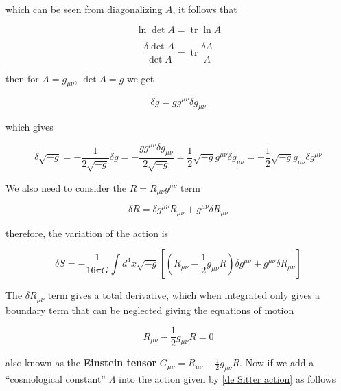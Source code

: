 \documentclass[a4paper,11pt]{article}
\numberwithin{equation}{section}
\numberwithin{figure}{section}
\begin{document}
\begin{large}
which can be seen from diagonalizing $A$, it follows that

\begin{equation}
\label{ln det A}    
    \ln \det A= \operatorname{tr} \ln A
\end{equation}

\begin{equation}
 \label{delta det A}   
    \frac{\delta \det A}{\det A} = \operatorname{tr} \frac{\delta A}{A}
\end{equation}


then for $A=g_{\mu \nu}$, $\det A=g$ we get


\begin{equation}
\label{delta g}    
    \delta g=g g^{\mu \nu} \delta g_{\mu \nu}
\end{equation}


which gives

\begin{equation}
\label{delta rt -g}    
    \delta \sqrt{-g}= -\frac{1}{2\sqrt{-g}}\delta g= -\frac{gg^{\mu \nu} \delta g_{\mu \nu}}{2\sqrt{-g}}=\frac{1}{2}\sqrt{-g} g^{\mu \nu} \delta g_{\mu \nu}=-\frac{1}{2}\sqrt{-g} g_{\mu \nu} \delta g^{\mu \nu}
\end{equation}


We also need to consider the $R=R_{\mu \nu} g^{\mu \nu}$ term

\begin{equation}
\label{delta R}
    \delta R= \delta g^{\mu \nu} R_{\mu \nu}+g^{\mu \nu} \delta R_{\mu \nu}
\end{equation}

therefore, the variation of the action is

\begin{equation}
\label{variation of action}
    \delta S= - \frac{1}{16\pi G} \int d^4x \sqrt{-g} [(R_{\mu \nu} -\frac{1}{2} g_{\mu \nu} R)\delta g^{\mu \nu}+g^{\mu \nu}\delta R_{\mu \nu}]
\end{equation}



The $\delta R_{\mu \nu}$ term gives a total derivative, which when integrated only gives a boundary term that can be neglected giving the equations of motion


\begin{equation}
\label{Einstein tensor}
    R_{\mu \nu}-\frac{1}{2}g_{\mu \nu} R=0
\end{equation}

also known as the \textbf{Einstein tensor} $G_{\mu \nu}= R_{\mu \nu}-\frac{1}{2}g_{\mu \nu} R$. Now if we add a ``cosmological constant'' $\Lambda$ into the action given by \eqref{de Sitter action} as follows


\end{large}
\end{document}

